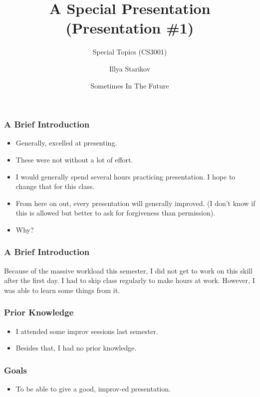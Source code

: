 \documentclass[handout,xclolor=dvipsnames]{beamer}    %
\title{A Special Presentation (Presentation \#1)}
\subtitle{Special Topics (CS3001)}
\author{Illya Starikov}
\date{Sometimes In The Future}
\institute{Missouri University of Science and Technology}
\begin{document}
\begin{darkframes}
    \maketitle

    \begin{frame}
        \frametitle{A Brief Introduction}

        \begin{itemize}
            \item Generally, excelled at presenting. \pause{}
            \item These were not without a lot of effort. \pause{}
            \item I would generally spend several hours practicing presentation.\pause{} I hope to change that for this class.\pause{}
            \item From here on out, every presentation will generally improved.\pause{} (I don't know if this is allowed but better to ask for forgiveness than permission).
            \item Why?
        \end{itemize}
    \end{frame}

    \begin{frame}
        \frametitle{A Brief Introduction}

        Because of the massive workload this semester, I did not get to work on this skill after the first day. I had to skip class regularly to make hours at work. However, I was able to learn some things from it.
    \end{frame}

    \begin{frame}
        \frametitle{Prior Knowledge}

        \begin{itemize}
                \item I attended some improv sessions last semester.
                \item Besides that, I had no prior knowledge.
        \end{itemize}
    \end{frame}

    \begin{frame}
        \frametitle{Goals}

        \begin{itemize}
            \item To be able to give a good, improv-ed presentation.
        \end{itemize}
    \end{frame}



\end{darkframes}
\end{document}

